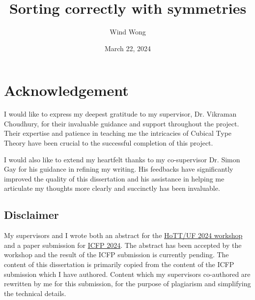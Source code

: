\documentclass{l4proj}
\begin{document}
\title{Sorting correctly with symmetries}
\author{Wind Wong}
\date{March 22, 2024}

\maketitle

\begin{abstract}
    
\end{abstract}


%
%
\def\consentname {Tsz Fung Wind Wong} %
\def\consentdate {18 March 2024} %
%
\educationalconsent

\chapter*{Acknowledgement}
I would like to express my deepest gratitude to my supervisor,
Dr. Vikraman Choudhury, for their invaluable guidance and support
throughout the project. Their expertise and patience in teaching me
the intricacies of Cubical Type Theory have been crucial to the
successful completion of this project.

I would also like to extend my heartfelt thanks to my co-supervisor
Dr. Simon Gay for his guidance in refining my writing.
His feedbacks have significantly improved the quality of this dissertation
and his assistance in helping me articulate my thoughts more
clearly and succinctly has been invaluable.

\section*{Disclaimer}
My supervisors and I wrote both an abstract for the
\href{https://hott-uf.github.io/2024/}{HoTT/UF 2024 workshop}
and a paper submission for \href{https://icfp24.sigplan.org/}{ICFP 2024}.
The abstract has been accepted by the workshop and the result of the
ICFP submission is currently pending. The content of this dissertation
is primarily copied from the content of the ICFP submission which I have
authored. Content which my supervisors co-authored are rewritten by me
for this submission, for the purpose of plagiarism and simplifying the
technical details.
\end{document}
